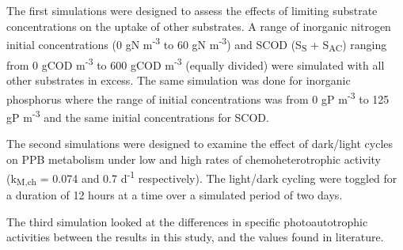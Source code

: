 The first simulations were designed to assess the effects of limiting substrate concentrations on the uptake of other substrates. A range of inorganic nitrogen initial concentrations (0 gN m\textsuperscript{-3} to 60 gN m\textsuperscript{-3}) and SCOD (S\textsubscript{S} + S\textsubscript{AC}) ranging from 0 gCOD m\textsuperscript{-3} to 600 gCOD m\textsuperscript{-3} (equally divided) were simulated with all other substrates in excess. The same simulation was done for inorganic phosphorus where the range of initial concentrations was from 0 gP m\textsuperscript{-3} to 125 gP m\textsuperscript{-3} and the same initial concentrations for SCOD. 

The second simulations were designed to examine the effect of dark/light cycles on PPB metabolism under low and high rates of chemoheterotrophic activity (k\textsubscript{M,ch} = 0.074 and 0.7 d\textsuperscript{-1} respectively). The light/dark cycling were toggled for a duration of 12 hours at a time over a simulated period of two days. 

The third simulation looked at the differences in specific photoautotrophic activities between the results in this study, and the values found in literature.



